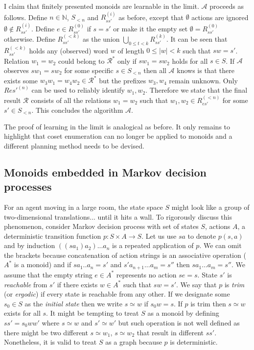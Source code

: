 \documentclass[12pt]{article}
\begin{document}
I claim that finitely presented monoids are learnable in the limit.
$\mathcal{A}$ proceeds as follows. Define $n \in \mathbb{N}$, $S_{<n}$ and $R_{ss'}^{(i)}$ as before, except that $\emptyset$ actions are ignored $\emptyset \notin R_{ss'}^{(i)}$. Define $e \in R_{ss'}^{(0)}$ if $s=s'$ or make it the empty set $\emptyset=R_{ss'}^{(0)}$ otherwise. Define $R_{ss'}^{(<k)}$ as the union $\bigcup_{0 \le t< k} R_{ss'}^{(k)}$. It can be seen that $R_{ss'}^{(< k)}$ holds any (observed) word $w$ of length $0\le|w|< k$ such that $sw=s'$. Relation $w_1=w_2$ could belong to $\mathcal{R}^*$ only if $sw_1=sw_2$ holds for all $s\in S$. If $\mathcal{A}$ observes $sw_1=sw_2$ for some specific $s\in S_{<n}$ then all $\mathcal{A}$ knows is that there exists some $w_3w_1=w_4w_2 \in \mathcal{R}^*$ but the prefixes $w_3,w_4$ remain unknown. Only $R{es'}^{(n)}$ can be used to reliably identify $w_1,w_2$. Therefore we state that the final result $\mathcal{R}$ consists of all the relations $w_1=w_2$ such that $w_1,w_2 \in R_{es'}^{(<n)}$ for some $s'\in S_{<n}$. This concludes the algorithm $\mathcal{A}$. 

The proof of learning in the limit is analogical as before.
It only remains to highlight that coset enumeration can no longer be applied to monoids and a different planning method needs to be devised.



\subsection{Monoids embedded in Markov decision processes}
\label{subsection:group_manifolds}
For an agent moving in a large room, the state space $S$ might look like a group of two-dimensional translations... until it hits a wall. To rigorously discuss this phenomenon, consider Markov decision process with set of states $S$, actions $A$, a deterministic transition function $p:S\times A \rightarrow S$. Let us use $sa$ to denote $p(s,a)$ and by induction $((sa_1)a_2)...a_n$ is a repeated application of $p$. We can omit the brackets because concatenation of action strings is an associative operation ($A^*$ is a monoid) and if $sa_1..a_n=s'$ and $s'a_{n+1}...a_{m}=s''$ then $sa_1...a_m=s''$. We assume that the empty string $e\in A^*$ represents no action $se=s$. State $s'$ is \textit{reachable} from $s'$ if there exists $w\in A^*$ such that $sw=s'$. We say that $p$ is \textit{trim} (or \textit{ergodic}) if every state is reachable from any other. If we designate some $s_0\in S$ as the \textit{initial state} then we write $s \simeq w$ if $s_0w=s$. If $p$ is trim then $s \simeq w$ exists for all $s$.
It might be tempting to treat $S$ as a monoid by defining $ss'=s_0ww'$ where $s\simeq w$ and $s'\simeq w'$ but such operation is not well defined as there might be two different $s\simeq w_1$, $s\simeq w_2$ that result in different $ss'$. Nonetheless, it is valid to treat $S$ as a graph because $p$ is deterministic.
\end{document}
